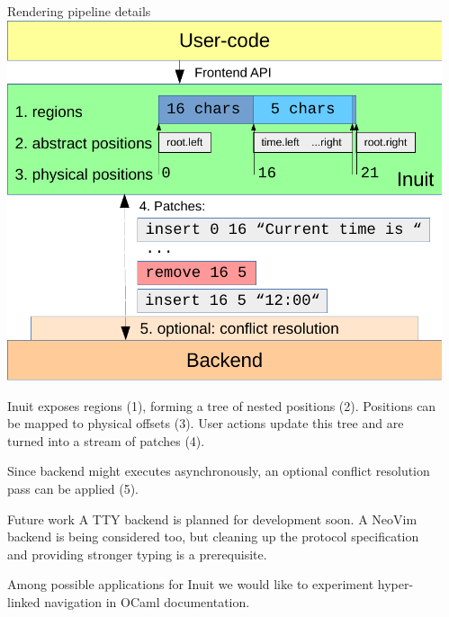 \documentclass[final]{beamer}
\newlength{\sepwid}
\newlength{\onecolwid}
\begin{document}
\begin{frame}[containsverbatim,t]
\begin{columns}[t]
\begin{column}{\sepwid}\end{column} %

\begin{column}{\onecolwid} %

\begin{block}{Rendering pipeline details}
\includegraphics[width=\onecolwid]{pipeline}

Inuit exposes regions (1), forming a tree of nested positions (2).  Positions
can be mapped to physical offsets (3). User actions update this tree and are
turned into a stream of patches (4).

Since backend might executes asynchronously, an optional conflict resolution
pass can be applied (5).
\end{block}

\begin{block}{Future work}
A TTY backend is planned for development soon.  A NeoVim backend is being
considered too, but cleaning up the protocol specification and providing
stronger typing is a prerequisite.

Among possible applications for Inuit we would like to experiment hyper-linked
navigation in OCaml documentation.

\end{block}



\end{column}
\end{columns}
\end{frame}
\end{document}
